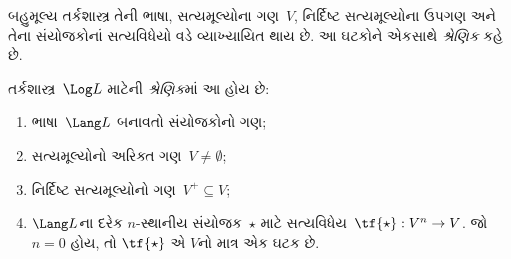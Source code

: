\documentclass[../../../include/open-logic-section]{subfiles}
\begin{document}


બહુમૂલ્ય તર્કશાસ્ત્ર તેની ભાષા, સત્યમૂલ્યોના ગણ~$V$,
નિર્દિષ્ટ સત્યમૂલ્યોના ઉપગણ અને તેના સંયોજકોનાં
સત્યવિધેયો વડે વ્યાખ્યાયિત થાય છે. આ ઘટકોને
એકસાથે \emph{શ્રેણિક} કહે છે.

\begin{defn}[શ્રેણિક]
તર્કશાસ્ત્ર~$\Log L$ માટેની \emph{શ્રેણિક}માં આ હોય છે:
\begin{enumerate}
\item ભાષા~$\Lang L$ બનાવતો સંયોજકોનો ગણ;
\item સત્યમૂલ્યોનો અરિક્ત ગણ~$V \neq \emptyset$;
\item નિર્દિષ્ટ સત્યમૂલ્યોનો ગણ~$V^+ \subseteq V$;
\item $\Lang L$ના દરેક $n$-સ્થાનીય સંયોજક~$\star$
માટે સત્યવિધેય~$\tf{\star} : V^n \to V$. જો
$n = 0$ હોય, તો $\tf{\star}$ એ $V$નો માત્ર એક ઘટક છે.
\end{enumerate}
\end{defn}
\end{document}
